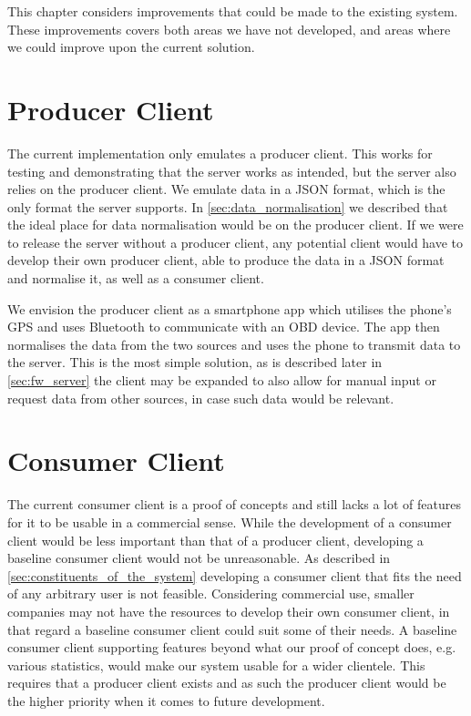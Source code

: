 This chapter considers improvements that could be made to the existing system.
These improvements covers both areas we have not developed, and areas where we could improve upon the current solution.
\section{Producer Client}
The current implementation only emulates a producer client.
This works for testing and demonstrating that the server works as intended, but the server also relies on the producer client.
We emulate data in a JSON format, which is the only format the server supports.
In \cref{sec:data_normalisation} we described that the ideal place for data normalisation would be on the producer client.
If we were to release the server without a producer client, any potential client would have to develop their own producer client, able to produce the data in a JSON format and normalise it, as well as a consumer client.

\bigskip
We envision the producer client as a smartphone app which utilises the phone's GPS and uses Bluetooth to communicate with an \ac{OBD} device.
The app then normalises the data from the two sources and uses the phone to transmit data to the server.
This is the most simple solution, as is described later in \cref{sec:fw_server} the client may be expanded to also allow for manual input or request data from other sources, in case such data would be relevant.
\section{Consumer Client}
The current consumer client is a proof of concepts and still lacks a lot of features for it to be usable in a commercial sense.
While the development of a consumer client would be less important than that of a producer client, developing a baseline consumer client would not be unreasonable.
As described in \cref{sec:constituents_of_the_system} developing a consumer client that fits the need of any arbitrary user is not feasible.
Considering commercial use, smaller companies may not have the resources to develop their own consumer client, in that regard a baseline consumer client could suit some of their needs.
A baseline consumer client supporting features beyond what our proof of concept does, e.g. various statistics, would make our system usable for a wider clientele.
This requires that a producer client exists and as such the producer client would be the higher priority when it comes to future development.
